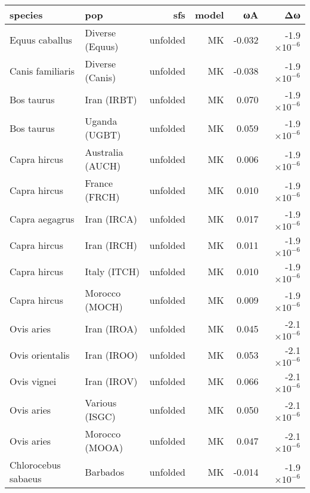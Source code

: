 \begin{tabular}{|l|l|r|r|r|r|}
\toprule
             species &                             pop &       sfs & model &       ωA &                   Δω \\
\midrule
      Equus caballus &                 Diverse (Equus) &  unfolded &    MK &   -0.032 & -1.9$\times 10^{-6}$ \\
    Canis familiaris &                 Diverse (Canis) &  unfolded &    MK &   -0.038 & -1.9$\times 10^{-6}$ \\
          Bos taurus &                     Iran (IRBT) &  unfolded &    MK &    0.070 & -1.9$\times 10^{-6}$ \\
          Bos taurus &                   Uganda (UGBT) &  unfolded &    MK &    0.059 & -1.9$\times 10^{-6}$ \\
        Capra hircus &                Australia (AUCH) &  unfolded &    MK &    0.006 & -1.9$\times 10^{-6}$ \\
        Capra hircus &                   France (FRCH) &  unfolded &    MK &    0.010 & -1.9$\times 10^{-6}$ \\
      Capra aegagrus &                     Iran (IRCA) &  unfolded &    MK &    0.017 & -1.9$\times 10^{-6}$ \\
        Capra hircus &                     Iran (IRCH) &  unfolded &    MK &    0.011 & -1.9$\times 10^{-6}$ \\
        Capra hircus &                    Italy (ITCH) &  unfolded &    MK &    0.010 & -1.9$\times 10^{-6}$ \\
        Capra hircus &                  Morocco (MOCH) &  unfolded &    MK &    0.009 & -1.9$\times 10^{-6}$ \\
          Ovis aries &                     Iran (IROA) &  unfolded &    MK &    0.045 & -2.1$\times 10^{-6}$ \\
     Ovis orientalis &                     Iran (IROO) &  unfolded &    MK &    0.053 & -2.1$\times 10^{-6}$ \\
         Ovis vignei &                     Iran (IROV) &  unfolded &    MK &    0.066 & -2.1$\times 10^{-6}$ \\
          Ovis aries &                  Various (ISGC) &  unfolded &    MK &    0.050 & -2.1$\times 10^{-6}$ \\
          Ovis aries &                  Morocco (MOOA) &  unfolded &    MK &    0.047 & -2.1$\times 10^{-6}$ \\
 Chlorocebus sabaeus &                        Barbados &  unfolded &    MK &   -0.014 & -1.9$\times 10^{-6}$ \\

\end{tabular}
